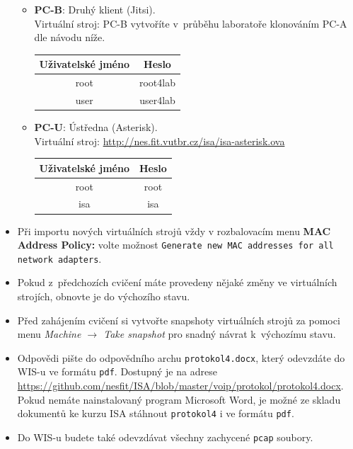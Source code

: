 \begin{itemize}
\begin{itemize}
	\item \textbf{PC-B}: Druhý klient (Jitsi).\\
	Virtuální stroj: PC-B vytvoříte v~průběhu laboratoře klonováním PC-A dle návodu níže.
	\begin{table}[H]
		\centering
		\begin{tabular}{|c|c|}
		\hline
		\textbf{Uživatelské jméno} & \textbf{Heslo} \\ \hline
		root                       & root4lab       \\ \hline
		user                       & user4lab       \\ \hline
		\end{tabular}
	\end{table}
	\item \textbf{PC-U}: Ústředna (Asterisk).\\
	Virtuální stroj: \url{http://nes.fit.vutbr.cz/isa/isa-asterisk.ova}
	\begin{table}[H]
		\centering
		\begin{tabular}{|c|c|}
		\hline
		\textbf{Uživatelské jméno} & \textbf{Heslo} \\ \hline
		root                       & root       \\ \hline
		isa                       & isa       \\ \hline
		\end{tabular}
	\end{table}
  \end{itemize}
  \item Při importu nových virtuálních strojů vždy v rozbalovacím menu \textbf{MAC Address Policy:} volte možnost \texttt{Generate new MAC addresses for all network adapters}.
  \item Pokud z~předchozích cvičení máte provedeny nějaké změny ve virtuálních strojích, obnovte je do výchozího stavu.
  \item Před zahájením cvičení si vytvořte snapshoty virtuálních strojů za pomoci
  menu \textit{Machine $\rightarrow$ Take snapshot} pro snadný návrat k~výchozímu stavu.
  \item Odpovědi pište do odpovědního archu \texttt{protokol4.docx}, který odevzdáte do WIS-u ve formátu \texttt{pdf}.
  Dostupný je na adrese\\
  \url{https://github.com/nesfit/ISA/blob/master/voip/protokol/protokol4.docx}.\\
  Pokud nemáte nainstalovaný program Microsoft Word, je možné ze skladu dokumentů ke kurzu ISA stáhnout \texttt{protokol4} i ve formátu \texttt{pdf}.
  \item Do WIS-u budete také odevzdávat všechny zachycené \texttt{pcap} soubory.
\end{itemize}



